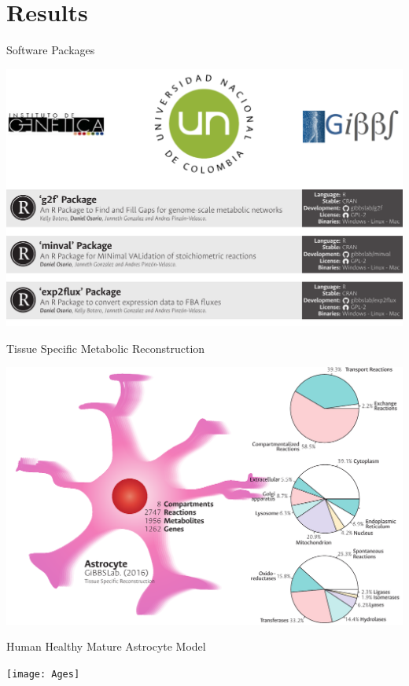 \documentclass[11pt]{beamer}
\begin{document}
\section{Results}
\begin{frame}{Software Packages}
\begin{center}
\includegraphics[width=\textwidth]{SPackages}
\end{center}
\end{frame}
\begin{frame}{Tissue Specific Metabolic Reconstruction}
\begin{center}
\includegraphics[width=\textwidth]{Astrocyte}
\end{center}
\end{frame}
\begin{frame}{Human Healthy Mature Astrocyte Model}
\begin{center}
\texttt{[image: Ages]}
\end{center}
\end{frame}
\end{document}

